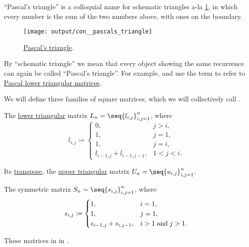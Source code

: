 \begin{concept}\label{con:pascals_triangle}
  \enquote{Pascal's triangle} is a colloquial name for schematic triangles a-la \cref{fig:con:pascals_triangle}, in which every number is the sum of the two numbers above, with ones on the boundary.

  \begin{figure}[!ht]
    \centering
    \texttt{[image: output/con\_\_pascals\_triangle]}
    \caption{\hyperref[con:pascals_triangle]{Pascal's triangle}.}\label{fig:con:pascals_triangle}
  \end{figure}

  By \enquote{schematic triangle} we mean that every object showing the same recurrence can again be called \enquote{Pascal's triangle}. For example,  and  use the term to refer to \hyperref[def:pascal_matrix/lower]{Pascal lower triangular matrices}.
\end{concept}

\begin{definition}\label{def:pascal_matrix}
  We will define three families of square matrices, which we will collectively call .
  \begin{thmenum}
     The \hyperref[def:triangular_matrix]{lower triangular} matrix \( L_n = \seq{ l_{i,j} }_{i,j=1}^n \), where
    \begin{equation*}
      l_{i,j} \coloneqq \begin{cases}
        0,                       &j > i, \\
        1,                       &j = 1, \\
        1,                       &j = i, \\
        l_{i-1,j} + l_{i-1,j-1}, &1 < j < i.
      \end{cases}
    \end{equation*}

     Its \hyperref[def:transpose_matrix]{transpose}, the \hyperref[def:triangular_matrix]{upper triangular} matrix \( U_n = \seq{ u_{i,j} }_{i,j=1}^n \).

     The symmetric matrix \( S_n = \seq{ s_{i,j} }_{i,j=1}^n \), where
    \begin{equation*}
      s_{i,j} \coloneqq \begin{cases}
        1,                     &i = 1, \\
        1,                     &j = 1, \\
        s_{i-1,j} + s_{i,j-1}, &i > 1 \T{and} j > 1.
      \end{cases}
    \end{equation*}
  \end{thmenum}
\end{definition}
\begin{comments}
  \item These matrices in  in \cite{notebook:code}.
\end{comments}

